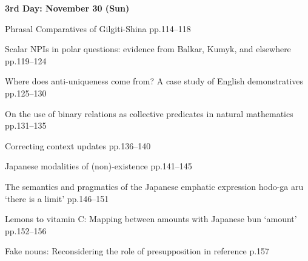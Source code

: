 \documentclass[12pt]{ltjarticle}
\begin{document}
\noindent\textbf{\large 
3rd Day: November 30 (Sun)
}\\




  
     {Phrasal Comparatives of Gilgiti-Shina}
     {pp.114--118}
  
     {Scalar NPIs in polar questions: evidence from Balkar, Kumyk, and elsewhere}
     {pp.119--124}
  
     {Where does anti-uniqueness come from? A case study of English demonstratives}
     {pp.125--130}




  
     {On the use of binary relations as collective predicates in natural mathematics}
     {pp.131--135}
  
     {Correcting context updates}
     {pp.136--140}




  
     {Japanese modalities of (non)-existence}
     {pp.141--145}
  
     {The semantics and pragmatics of the Japanese emphatic expression hodo-ga aru ‘there is a limit’}
     {pp.146--151}
  
     {Lemons to vitamin C: Mapping between amounts with Japanese bun ‘amount’}
     {pp.152--156}




  
     {Fake nouns: Reconsidering the role of presupposition in reference}
     {p.157}






  
\end{document}
